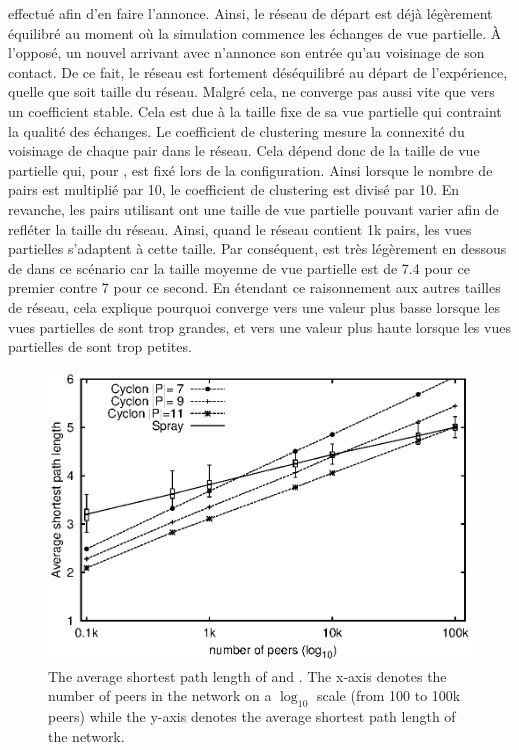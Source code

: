 \begin{asparadesc}
  effectué afin d'en faire l'annonce. Ainsi, le réseau de départ est déjà
  légèrement équilibré au moment où la simulation commence les échanges de vue
  partielle. À l'opposé, un nouvel arrivant avec \SPRAY n'annonce son entrée
  qu'au voisinage de son contact. De ce fait, le réseau est fortement
  déséquilibré au départ de l'expérience, quelle que soit taille du
  réseau. Malgré cela, \CYCLON ne converge pas aussi vite que \SPRAY vers un
  coefficient stable. Cela est due à la taille fixe de sa vue partielle qui
  contraint la qualité des échanges. Le coefficient de clustering mesure la
  connexité du voisinage de chaque pair dans le réseau. Cela dépend donc de la
  taille de vue partielle qui, pour \CYCLON, est fixé lors de la configuration.
  Ainsi lorsque le nombre de pairs est multiplié par 10, le coefficient de
  clustering est divisé par 10. En revanche, les pairs utilisant \SPRAY ont une
  taille de vue partielle pouvant varier afin de refléter la taille du réseau.
  Ainsi, quand le réseau contient 1k pairs, les vues partielles s'adaptent à
  cette taille. Par conséquent, \SPRAY est très légèrement en dessous de \CYCLON
  dans ce scénario car la taille moyenne de vue partielle est de 7.4 pour ce
  premier contre 7 pour ce second. En étendant ce raisonnement aux autres
  tailles de réseau, cela explique pourquoi \SPRAY converge vers une valeur plus
  basse lorsque les vues partielles de \CYCLON sont trop grandes, et vers une
  valeur plus haute lorsque les vues partielles de \CYCLON sont trop petites.
\end{asparadesc}

\begin{figure}
  \centering
  \includegraphics[width=.8\textwidth]{img/spray/avgpath.eps}
  \caption{\label{fig:avgpath}The average shortest path length of \SPRAY and
    \CYCLON. The x-axis denotes the number of peers in the network on a
    $\log_{10}$ scale (from 100 to 100k peers) while the y-axis denotes the
    average shortest path length of the network.}
\end{figure}


